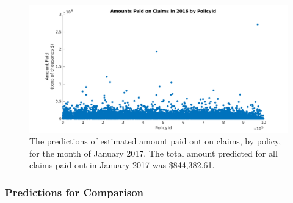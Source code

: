 \documentclass[12pt,letterpaper,titlepage]{article}
\begin{document}
			\begin{figure}[!ht]
				\centering
				\includegraphics[scale=0.45]{amountByPolicyId_2016.png}
				\caption{The predictions of estimated amount paid out on claims, by policy, for the month of January 2017. The total amount predicted for all claims paid out in January 2017 was \$844,382.61.
} 
				\label{fig:amountByPolicyId_2016}
			\end{figure}	
			\FloatBarrier			
		
			\subsubsection{Predictions for Comparison} \label{sec:predComp}
\end{document}
